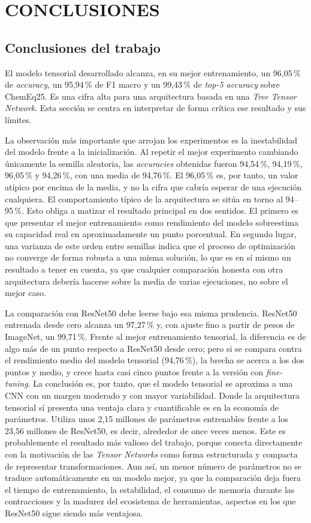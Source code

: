 \chapter{CONCLUSIONES}
\section{Conclusiones del trabajo}

El modelo tensorial desarrollado alcanza, en su mejor entrenamiento, un 96,05\,\% de \textit{accuracy}, un 95,94\,\% de F1 macro y un 99,43\,\% de \textit{top-5 accuracy} sobre ChemEq25. Es una cifra alta para una arquitectura basada en una \textit{Tree Tensor Network}. Esta sección se centra en interpretar de forma crítica ese resultado y sus límites.

La observación más importante que arrojan los experimentos es la inestabilidad del modelo frente a la inicialización. Al repetir el mejor experimento cambiando únicamente la semilla aleatoria, las \textit{accuracies} obtenidas fueron 94,54\,\%, 94,19\,\%, 96,05\,\% y 94,26\,\%, con una media de 94,76\,\%. El 96,05\,\% es, por tanto, un valor atípico por encima de la media, y no la cifra que cabría esperar de una ejecución cualquiera. El comportamiento típico de la arquitectura se sitúa en torno al 94--95\,\%. Esto obliga a matizar el resultado principal en dos sentidos. El primero es que presentar el mejor entrenamiento como rendimiento del modelo sobreestima su capacidad real en aproximadamente un punto porcentual. En segundo lugar, una varianza de este orden entre semillas indica que el proceso de optimización no converge de forma robusta a una misma solución, lo que es en sí mismo un resultado a tener en cuenta, ya que cualquier comparación honesta con otra arquitectura debería hacerse sobre la media de varias ejecuciones, no sobre el mejor caso.

La comparación con ResNet50 debe leerse bajo esa misma prudencia. ResNet50 entrenada desde cero alcanza un 97,27\,\% y, con ajuste fino a partir de pesos de ImageNet, un 99,71\,\%. Frente al mejor entrenamiento tensorial, la diferencia es de algo más de un punto respecto a ResNet50 desde cero; pero si se compara contra el rendimiento medio del modelo tensorial (94,76\,\%), la brecha se acerca a los dos puntos y medio, y crece hasta casi cinco puntos frente a la versión con \textit{fine-tuning}. La conclusión es, por tanto, que el modelo tensorial se aproxima a una CNN con un margen moderado y con mayor variabilidad. Donde la arquitectura tensorial sí presenta una ventaja clara y cuantificable es en la economía de parámetros. Utiliza unos 2,15 millones de parámetros entrenables frente a los 23,56 millones de ResNet50, es decir, alrededor de once veces menos. Este es probablemente el resultado más valioso del trabajo, porque conecta directamente con la motivación de las \textit{Tensor Networks} como forma estructurada y compacta de representar transformaciones. Aun así, un menor número de parámetros no se traduce automáticamente en un modelo mejor, ya que la comparación deja fuera el tiempo de entrenamiento, la estabilidad, el consumo de memoria durante las contracciones y la madurez del ecosistema de herramientas, aspectos en los que ResNet50 sigue siendo más ventajosa.


